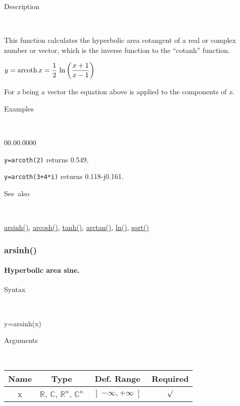 \begin{description}
\item [Description]~
\end{description}
This function calculates the hyperbolic area cotangent of a real or
complex number or vector, which is the inverse function to the {}``cotanh''
function.

\medskip{}
$y=\textrm{arcoth\,}x={\displaystyle \frac{1}{2}\,\ln\left(\frac{x+1}{x-1}\right)}$ 
\medskip{}

For \textit{x} being a vector the equation above is applied
to the components of \textit{x}.

\begin{description}
\item [Examples]~
\end{description}
\begin{lyxlist}{00.00.0000}
\item [\texttt{y=arcoth(2)}]returns 0.549,
\item [\texttt{y=arcoth(3+4{*}i)}]returns 0.118-j0.161.
\end{lyxlist}
\begin{description}
\item [See~also]~
\end{description}
\textcolor{blue}{\hyperlink{arsinh}{arsinh()}}\textcolor{black}{,}
\textcolor{blue}{\hyperlink{arcosh}{arcosh()}}\textcolor{black}{,}
\textcolor{blue}{\hyperlink{tanh}{tanh()}}\textcolor{black}{,} \textcolor{blue}{\hyperlink{arctan}{arctan()}}\textcolor{black}{,}
\textcolor{blue}{\hyperlink{ln}{ln()}}\textcolor{black}{,} \textcolor{blue}{\hyperlink{sqrt}{sqrt()}}


\newpage
\subsubsection*{\hypertarget{arsinh}{}{\Large arsinh()}}


\paragraph{\label{par:Hyperbolic-area-sine}Hyperbolic area sine.}

\begin{description}
\item [Syntax]~
\end{description}
y=arsinh(x)

\begin{description}
\item [Arguments]~
\end{description}
\begin{tabular}{|c|c|c|c|}
\hline 
Name&
Type&
Def. Range&
Required\tabularnewline
\hline
\hline 
x&
$\mathbb{R}$, $\mathbb{C}$, $\mathbb{R}^{n}$, $\mathbb{C}^{n}$&
$\left]-\infty,+\infty\right[$&
$\surd$\tabularnewline
\hline
\end{tabular}

